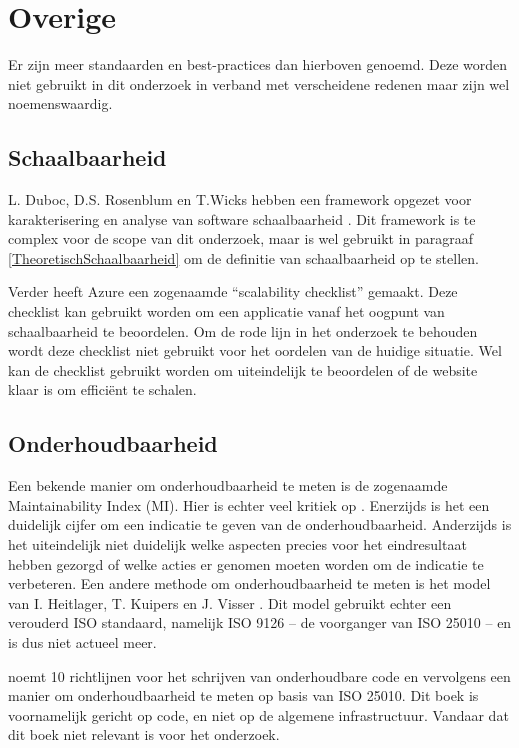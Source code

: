 \section{Overige}

Er zijn meer standaarden en best-practices dan hierboven genoemd. Deze worden niet gebruikt in dit onderzoek in verband met verscheidene redenen maar zijn wel noemenswaardig.

\subsection{Schaalbaarheid}
L. Duboc, D.S. Rosenblum en T.Wicks hebben een framework opgezet voor karakterisering en analyse van software schaalbaarheid \parencite{ScalabilityFramework}. Dit framework is te complex voor de scope van dit onderzoek, maar is wel gebruikt in paragraaf \ref{TheoretischSchaalbaarheid} om de definitie van schaalbaarheid op te stellen.

Verder heeft Azure \parencite{AzureScalability} een zogenaamde \enquote{scalability checklist} gemaakt. Deze checklist kan gebruikt worden om een applicatie vanaf het oogpunt van schaalbaarheid te beoordelen. Om de rode lijn in het onderzoek te behouden wordt deze checklist niet gebruikt voor het oordelen van de huidige situatie. Wel kan de checklist gebruikt worden om uiteindelijk te beoordelen of de website klaar is om efficiënt te schalen.

\subsection{Onderhoudbaarheid}
Een bekende manier om onderhoudbaarheid te meten is de zogenaamde Maintainability Index (MI). Hier is echter veel kritiek op \parencite{MaintainabilityLiteratureReview, WhyNoMI, WhyNoMI2, MeasuringMaintainability}. Enerzijds is het een duidelijk cijfer om een indicatie te geven van de onderhoudbaarheid. Anderzijds is het uiteindelijk niet duidelijk welke aspecten precies voor het eindresultaat hebben gezorgd of welke acties er genomen moeten worden om de indicatie te verbeteren. Een andere methode om onderhoudbaarheid te meten is het model van I. Heitlager, T. Kuipers en J. Visser \parencite{MeasuringMaintainability}. Dit model gebruikt echter een verouderd ISO standaard, namelijk ISO 9126 -- de voorganger van ISO 25010 -- en is dus niet actueel meer.

\parencite{MaintainableSoftware} noemt 10 richtlijnen voor het schrijven van onderhoudbare code en vervolgens een manier om onderhoudbaarheid te meten op basis van ISO 25010. Dit boek is voornamelijk gericht op code, en niet op de algemene infrastructuur. Vandaar dat dit boek niet relevant is voor het onderzoek.
 
